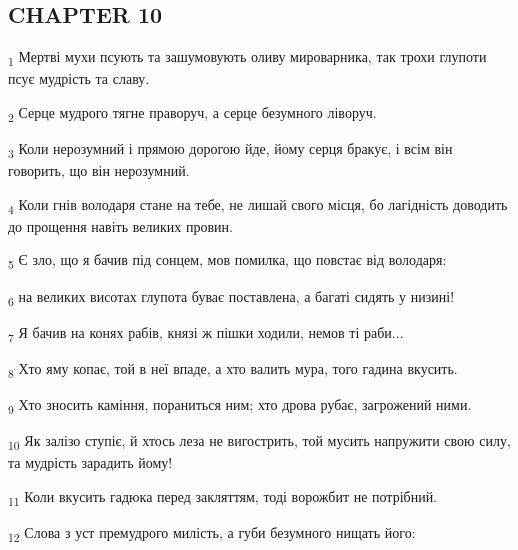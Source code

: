 \subsection{CHAPTER 10}
\begin{tcolorbox}
\textsubscript{1} Мертві мухи псують та зашумовують оливу мироварника, так трохи глупоти псує мудрість та славу.
\end{tcolorbox}
\begin{tcolorbox}
\textsubscript{2} Серце мудрого тягне праворуч, а серце безумного ліворуч.
\end{tcolorbox}
\begin{tcolorbox}
\textsubscript{3} Коли нерозумний і прямою дорогою йде, йому серця бракує, і всім він говорить, що він нерозумний.
\end{tcolorbox}
\begin{tcolorbox}
\textsubscript{4} Коли гнів володаря стане на тебе, не лишай свого місця, бо лагідність доводить до прощення навіть великих провин.
\end{tcolorbox}
\begin{tcolorbox}
\textsubscript{5} Є зло, що я бачив під сонцем, мов помилка, що повстає від володаря:
\end{tcolorbox}
\begin{tcolorbox}
\textsubscript{6} на великих висотах глупота буває поставлена, а багаті сидять у низині!
\end{tcolorbox}
\begin{tcolorbox}
\textsubscript{7} Я бачив на конях рабів, князі ж пішки ходили, немов ті раби...
\end{tcolorbox}
\begin{tcolorbox}
\textsubscript{8} Хто яму копає, той в неї впаде, а хто валить мура, того гадина вкусить.
\end{tcolorbox}
\begin{tcolorbox}
\textsubscript{9} Хто зносить каміння, пораниться ним; хто дрова рубає, загрожений ними.
\end{tcolorbox}
\begin{tcolorbox}
\textsubscript{10} Як залізо ступіє, й хтось леза не вигострить, той мусить напружити свою силу, та мудрість зарадить йому!
\end{tcolorbox}
\begin{tcolorbox}
\textsubscript{11} Коли вкусить гадюка перед закляттям, тоді ворожбит не потрібний.
\end{tcolorbox}
\begin{tcolorbox}
\textsubscript{12} Слова з уст премудрого милість, а губи безумного нищать його:
\end{tcolorbox}
